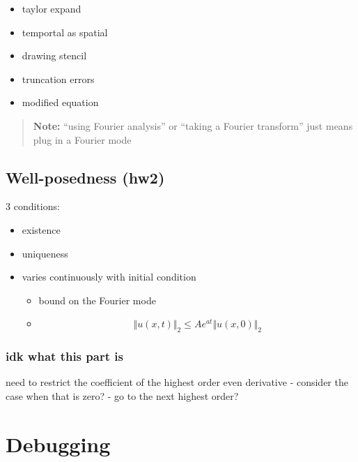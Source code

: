 \documentclass[
]{article}
\providecommand{\tightlist}{%
  \setlength{\itemsep}{0pt}\setlength{\parskip}{0pt}}
\begin{document}
\begin{itemize}
\tightlist
\item
  taylor expand
\item
  temportal as spatial
\item
  drawing stencil
\item
  truncation errors
\item
  modified equation
\end{itemize}

\begin{quote}
\textbf{Note:} ``using Fourier analysis'' or ``taking a Fourier
transform'' just means plug in a Fourier mode
\end{quote}

\hypertarget{well-posedness-hw2}{%
\subsection{Well-posedness (hw2)}\label{well-posedness-hw2}}

3 conditions:

\begin{itemize}
\tightlist
\item
  existence
\item
  uniqueness
\item
  varies continuously with initial condition

  \begin{itemize}
  \tightlist
  \item
    bound on the Fourier mode
  \item
    \[ \Vert u(x,t) \Vert_2 \leq A e^{at} \Vert u(x,0) \Vert_2 \]
  \end{itemize}
\end{itemize}

\hypertarget{idk-what-this-part-is}{%
\subsubsection{idk what this part is}\label{idk-what-this-part-is}}

need to restrict the coefficient of the highest order even derivative -
consider the case when that is zero? - go to the next highest order?

\hypertarget{debugging}{%
\section{Debugging}\label{debugging}}
\end{document}
